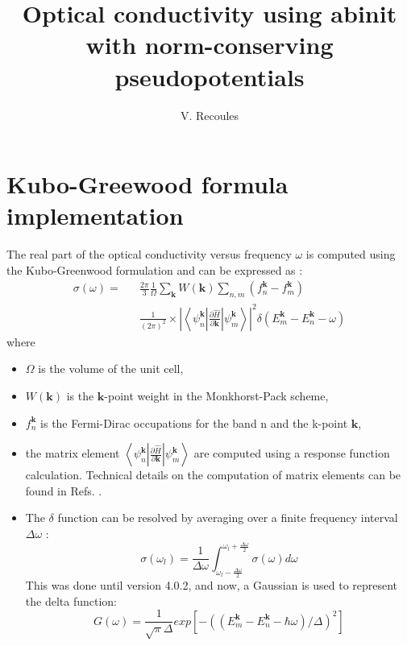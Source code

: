 \documentclass[a4,12pts]{article}
\begin{document}
 
 
\title{Optical conductivity using abinit with norm-conserving pseudopotentials} 
\author{V. Recoules}

\maketitle 
 
\section{Kubo-Greewood formula implementation} 
The real part of the optical conductivity versus frequency $\omega$ is 
computed using the
Kubo-Greenwood formulation \cite{KUBO57, GREE58} and can be expressed as : 
% 
\begin {eqnarray} 
\sigma(\omega) =&&{\frac {2\pi} {3 }}{\frac 1 \Omega}\sum_{\bm k} W({\bm k}) 
 \sum_{n,m}(f_n^{\bm{k}}-f_m^{\bm{k}}) \nonumber \\ 
&&{\frac 1 {(2 \pi)^2}}\times \left | \left < \psi_n^{\bm{k}} \left |   
\frac{\partial \hat{H}}{\partial \bm{k}} \right|\psi_m^{\bm{k}}\right >  
  \right|^2 \delta(E_m^{\bm{k}}-E_n^{\bm{k}}- \omega) 
 \label{KUGR} 
\end {eqnarray} 
% 
where 
\begin{itemize}
\item $\Omega$ is the volume of the unit cell,
\item $W(\bm{k})$ is the $\bm{k}$-point weight in the Monkhorst-Pack scheme,
\item $f_n^{\bm{k}}$ is the Fermi-Dirac occupations for the band n and the k-point $\bm{k}$,
\item the matrix element $\left < \psi_n^{\bm{k}} \left |   
\frac{\partial \hat{H}}{\partial \bm{k}} \right|\psi_m^{\bm{k}}\right >$
 are  computed using a response function calculation.
Technical details on the computation of matrix
elements can be found in Refs.  \cite{GONZ97, GONZL97}.
\item The $\delta$ function can be resolved by averaging over a finite frequency interval 
$\Delta \omega$ \cite{PFAF97}: 
% 
\begin{equation} 
 \sigma(\omega_l) = \frac{1}{\Delta \omega} \int_{\omega_l-\frac{\Delta \omega}{2}} 
  ^{\omega_l+\frac{\Delta \omega}{2}} \sigma(\omega) d\omega 
 \label{AVER} 
\end{equation} 
This was done until version 4.0.2, and now, a Gaussian is used to represent the delta function:
%
\begin{equation}
G(\omega)=\frac{1}{\sqrt{\pi}\Delta}exp\left[ -((E_m^{\bm{k}}-E_n^{\bm{k}}-\hbar \omega)/\Delta)^2
\right]
\end{equation}
%
\end{itemize}
% 
\end{document}
